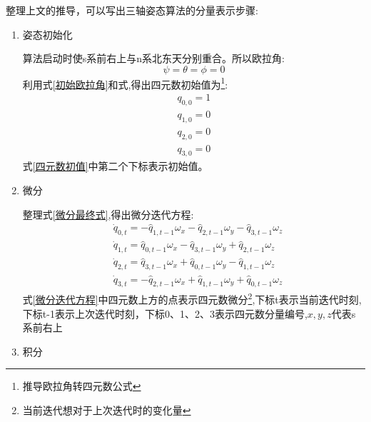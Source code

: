 \documentclass[12pt,a4paper]{article}
\begin{document}
整理上文的推导，可以写出三轴姿态算法的分量表示步骤:
\begin{enumerate}
    \item 姿态初始化

        算法启动时使s系前右上与n系北东天分别重合。所以欧拉角:
        \begin{equation}\label{初始欧拉角}
            \psi = \theta = \phi = 0
        \end{equation}
        利用式\ref{初始欧拉角}和式,得出四元数初始值为\footnote{推导欧拉角转四元数公式}:
        \begin{equation}\label{四元数初值}
            \begin{aligned} 
                q_{0,0} = 1 \\
                q_{1,0} = 0 \\
                q_{2,0} = 0 \\
                q_{3,0} = 0
            \end{aligned}
        \end{equation}
        式\ref{四元数初值}中第二个下标表示初始值。
    \item 微分

        整理式\ref{微分最终式},得出微分迭代方程:
        \begin{equation} \label{微分迭代方程}
            \begin{aligned} 
                &\dot{q}_{0,t} = -\hat{q}_{1,t-1} \omega_x - \hat{q}_{2,t-1} \omega_y - \hat{q}_{3,t-1} \omega_z \\
                &\dot{q}_{1,t} =  \hat{q}_{0,t-1} \omega_x - \hat{q}_{3,t-1} \omega_y + \hat{q}_{2,t-1} \omega_z \\
                &\dot{q}_{2,t} =  \hat{q}_{3,t-1} \omega_x + \hat{q}_{0,t-1} \omega_y - \hat{q}_{1,t-1} \omega_z \\
                &\dot{q}_{3,t} = -\hat{q}_{2,t-1} \omega_x + \hat{q}_{1,t-1} \omega_y + \hat{q}_{0,t-1} \omega_z
            \end{aligned}
        \end{equation} 
        式\ref{微分迭代方程}中四元数上方的点表示四元数微分\footnote{当前迭代想对于上次迭代时的变化量},下标t表示当前迭代时刻,下标t-1表示上次迭代时刻，下标0、1、2、3表示四元数分量编号,$x,y,z$代表s系前右上
    \item 积分


\end{enumerate}
\end{document}

